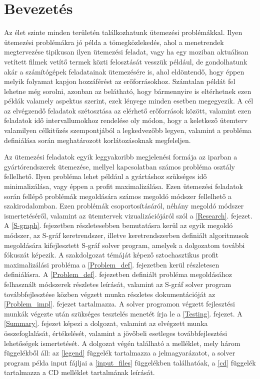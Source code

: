 \chapter{Bevezetés}
\setcounter{page}{1}
Az élet szinte minden területén találkozhatunk ütemezési problémákkal.
Ilyen ütemezési problémákra jó példa a tömegközlekedés, ahol a menetrendek megtervezése tipikusan ilyen ütemezési feladat, vagy ha egy moziban aktuálisan vetített filmek vetítő termek közti felosztását vesszük például, de gondolhatunk akár a számítógépek feladatainak ütemezésére is, ahol eldöntendő, hogy éppen melyik folyamat kapjon hozzáférést az erőforrásokhoz.
Számtalan példát fel lehetne még sorolni, azonban az belátható, hogy bármennyire is eltérhetnek ezen példák valamely aspektus szerint, ezek lényege minden esetben megegyezik.
A cél az elvégzendő feladatok szétosztása az elérhető erőforrások között, valamint ezen feladatok idő intervallumokhoz rendelése oly módon, hogy a keletkező ütemterv valamilyen célkitűzés szempontjából a legkedvezőbb legyen, valamint a probléma definiálása során meghatározott korlátozásoknak megfeleljen.

Az ütemezési feladatok egyik leggyakoribb megjelenési formája az iparban a gyártórendszerek ütemezése, mellyel kapcsolatban számos probléma osztály fellelhető.
Ilyen probléma lehet például a gyártáshoz szükséges idő minimalizálása, vagy éppen a profit maximalizálása. 
Ezen ütemezési feladatok során fellépő problémák megoldására számos megoldó módszer fellelhető a szakirodalomban.
Ezen problémák csoportosításáról, néhány megoldó módszer ismertetéséről, valamint az ütemtervek vizualizációjáról szól a \ref{Research}. fejezet.
A \ref{S-graph}. fejezetben részletesebben bemutatásra kerül az egyik megoldó módszer, az S-gráf keretrendszer, illetve keretrendszerben definiált algoritmusok megoldására kifejlesztett S-gráf solver program, amelyek a dolgozatom további fókuszát képezik.
A szakdolgozat témáját képező sztochasztikus profit maximalizálási probléma a \ref {Problem_def}. fejezetben kerül részletesen definiálásra.
A \ref{Problem_def}. fejezetben definiált probléma megoldásához felhasznált módszerek részletes leírását, valamint az S-gráf solver program továbbfejlesztése közben végzett munka részletes dokumentációját az \ref{Problem_impl}. fejezet tartalmazza.
A solver programon végzett fejlesztési munkák végezte után szükséges tesztelés menetét írja le a \ref{Testing}. fejezet.
A \ref{Summary}. fejezet képezi a dolgozat, valamint az elvégzett munka összefoglalását, értékelését, valamint a jövőbeli esetleges továbbfejlesztési lehetőségek ismertetését.
A dolgozat végén található a melléklet, mely három függelékből áll: az \ref{legend} függelék tartalmazza a jelmagyarázatot, a solver program példa input fájljai a \ref{input_files} függelékben találhatóak, a \ref{cd} függelék tartalmazza a CD melléklet tartalmának leírását.   